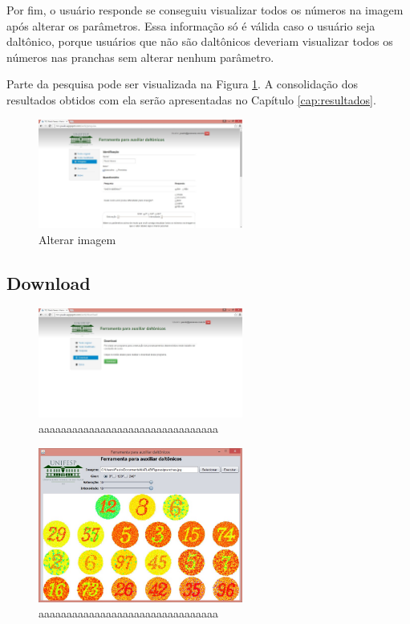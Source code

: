 \documentclass[	12pt, Times, openright, twoside, a4paper, english, brazil]{abntex2}
\begin{document}
Por fim, o usuário responde se conseguiu visualizar todos os números na imagem após alterar os parâmetros. Essa informação só é válida caso o usuário seja daltônico, porque usuários que não são daltônicos deveriam visualizar todos os números nas pranchas sem alterar nenhum parâmetro.

Parte da pesquisa pode ser visualizada na Figura \ref{fig:telaPesquisa}. A consolidação dos resultados obtidos com ela serão apresentadas no Capítulo \ref{cap:resultados}.

\begin{figure}[!htb]
\centering \includegraphics[width=0.6\textwidth]{telaPesquisa.jpg}
\caption{Alterar imagem} \label{fig:telaPesquisa}
\end{figure}


\subsection{Download}

\begin{figure}[!htb]
\centering \includegraphics[width=0.6\textwidth]{telaDownload.jpg}
\caption{aaaaaaaaaaaaaaaaaaaaaaaaaaaaaaaa} \label{fig:figuraDownload}
\end{figure}

\begin{figure}[!htb]
\centering \includegraphics[width=0.6\textwidth]{telaFerramenta.jpg}
\caption{aaaaaaaaaaaaaaaaaaaaaaaaaaaaaaaa} \label{fig:telaFerramenta}
\end{figure}
\end{document}

